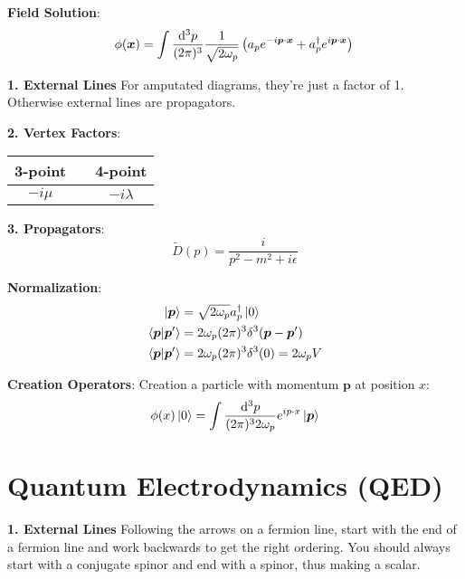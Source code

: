\documentclass[12pt]{article}
\newcommand{\diff}{\mathop{}\!\mathrm{d}}
\theoremstyle{definition}
\begin{document}
\textbf{Field Solution}:
\begin{equation*}
    \phi(\bm{x}) = \int \frac{\diff^3 p}{(2\pi)^3} \frac{1}{\sqrt{2\omega_p} } \left( a_p e^{-i \bm{p} \cdot \bm{x}} + a^\dagger_p e^{i \bm{p} \cdot \bm{x}} \right) \\
\end{equation*}

\textbf{1. External Lines} For amputated diagrams, they're just a factor of 1. Otherwise external lines are
propagators.

\textbf{2. Vertex Factors}:
\begin{center}
    \begin{tabular}{ccc}
        3-point & \qquad & 4-point \\
        \hline
        $-i\mu$ & & $-i\lambda$
    \end{tabular}
\end{center}

\textbf{3. Propagators}:
\begin{equation*}
    \tilde{D}(p) = \frac{i}{p^2 - m^2 + i\epsilon}
\end{equation*}

\textbf{Normalization}:
\begin{equation*}
\begin{split}
    \ket{\bm{p}} &= \sqrt{2\omega_p} a^\dagger_p \ket{0} \\
    \braket{\bm{p}|\bm{p}'} &= 2\omega_p (2\pi)^3 \delta^3(\bm{p} - \bm{p}') \\
    \braket{\bm{p}|\bm{p}'} &= 2\omega_p (2\pi)^3 \delta^3(0) = 2\omega_p V \\
\end{split}
\end{equation*}

\textbf{Creation Operators}:
Creation a particle with momentum $\bm{p}$ at position $x$:
\begin{equation*}
\begin{split}
    \phi(x) \ket{0} &= \int \frac{\diff^3 p}{(2\pi)^3 2\omega_p} e^{i p \cdot x} \ket{\bm{p}} \\
\end{split}
\end{equation*}

\section{Quantum Electrodynamics (QED)}
\textbf{1. External Lines} Following the arrows on a fermion line, start with the end of a fermion line
and work backwards to get the right ordering. You should always start with a conjugate spinor and end
with a spinor, thus making a scalar.
\end{document}
